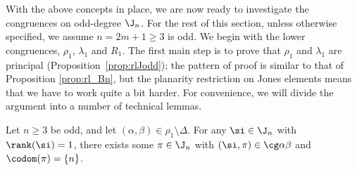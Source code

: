 With the above concepts in place, we are now ready to investigate the congruences on odd-degree $\J_n$.
%
For the rest of this section, unless otherwise specified, we assume $n=2m+1\geq3$ is odd.
%
We begin with the lower congruences, $\rho_1$, $\lambda_1$ and $R_1$.  The first main step is to prove that $\rho_1$ and $\lambda_1$ are principal (Proposition~\ref{prop:rlJodd}); the pattern of proof is similar to that of Proposition \ref{prop:rl_Bn}, but the planarity restriction on Jones elements means that we have to work quite a bit harder.  For convenience, we will divide the argument into a number of technical lemmas.


\begin{lemma}\label{lem:bzn}
Let $n\geq3$ be odd, and let $(\alpha,\beta)\in\rho_1\setminus\Delta$.  For any $\si\in\J_n$ with $\rank(\si)=1$, there exists some $\pi\in\J_n$ with $(\si,\pi)\in\cg\alpha\beta$ and $\codom(\pi)=\{n\}$.
\end{lemma}

